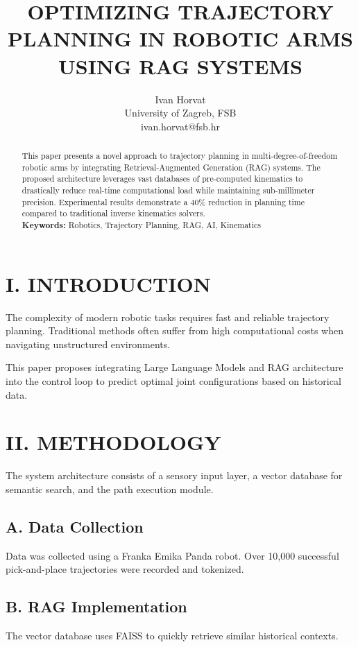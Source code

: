 \documentclass[10pt,a4paper,twocolumn]{article}
\title{\vspace{-1.5cm}\Large\bfseries\uppercase{Optimizing Trajectory Planning in Robotic Arms Using RAG Systems}}
\author{\normalsize Ivan Horvat \\ \small University of Zagreb, FSB \\ \small ivan.horvat@fsb.hr}
\date{}
\begin{document}
\maketitle

\begin{abstract}
\noindent This paper presents a novel approach to trajectory planning in multi-degree-of-freedom robotic arms by integrating Retrieval-Augmented Generation (RAG) systems. The proposed architecture leverages vast databases of pre-computed kinematics to drastically reduce real-time computational load while maintaining sub-millimeter precision. Experimental results demonstrate a 40\% reduction in planning time compared to traditional inverse kinematics solvers.
\vspace{0.5cm}\\
\noindent \textbf{Keywords:} Robotics, Trajectory Planning, RAG, AI, Kinematics
\end{abstract}

\section{I. INTRODUCTION}
The complexity of modern robotic tasks requires fast and reliable trajectory planning. Traditional methods often suffer from high computational costs when navigating unstructured environments.

This paper proposes integrating Large Language Models and RAG architecture into the control loop to predict optimal joint configurations based on historical data.

\section{II. METHODOLOGY}
The system architecture consists of a sensory input layer, a vector database for semantic search, and the path execution module.

\subsection{A. Data Collection}
Data was collected using a Franka Emika Panda robot. Over 10,000 successful pick-and-place trajectories were recorded and tokenized.

\subsection{B. RAG Implementation}
The vector database uses FAISS to quickly retrieve similar historical contexts.
\end{document}
